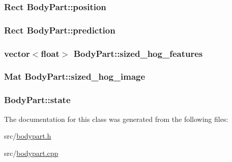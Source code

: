 \label{class_body_part_a9d7f6ec18ce64885e9bfe324a5084e6b}
\hypertarget{class_body_part_a1ebad48b1ef92b8f7386fc88edf7634d}{
\subsubsection[{position}]{\setlength{\rightskip}{0pt plus 5cm}Rect {\bf BodyPart::position}}}
\label{class_body_part_a1ebad48b1ef92b8f7386fc88edf7634d}
\hypertarget{class_body_part_a085e41dccbaf4c5131185f16a6f54e2f}{
\subsubsection[{prediction}]{\setlength{\rightskip}{0pt plus 5cm}Rect {\bf BodyPart::prediction}}}
\label{class_body_part_a085e41dccbaf4c5131185f16a6f54e2f}
\hypertarget{class_body_part_a3f5a0f7d38d2232a8cfc0249ab155362}{
\subsubsection[{sized\_\-hog\_\-features}]{\setlength{\rightskip}{0pt plus 5cm}vector$<$float$>$ {\bf BodyPart::sized\_\-hog\_\-features}}}
\label{class_body_part_a3f5a0f7d38d2232a8cfc0249ab155362}
\hypertarget{class_body_part_a70d555b6aec42d21a33486aa551fbe01}{
\subsubsection[{sized\_\-hog\_\-image}]{\setlength{\rightskip}{0pt plus 5cm}Mat {\bf BodyPart::sized\_\-hog\_\-image}}}
\label{class_body_part_a70d555b6aec42d21a33486aa551fbe01}
\hypertarget{class_body_part_ad2d71d425b166e90ca6b4ef393c8b9ef}{
\subsubsection[{state}]{ {\bf BodyPart::state}}}
\label{class_body_part_ad2d71d425b166e90ca6b4ef393c8b9ef}


The documentation for this class was generated from the following files:\begin{DoxyCompactItemize}
\item 
src/\hyperlink{bodypart_8h}{bodypart.h}\item 
src/\hyperlink{bodypart_8cpp}{bodypart.cpp}\end{DoxyCompactItemize}
